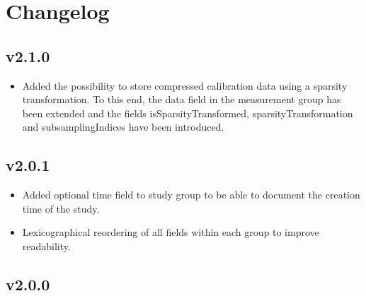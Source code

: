 \documentclass[landscape,a4paper]{article} %
\newcommand{\inlvar}[1]{{\ttfamily#1}}
\begin{document}
\clearpage
\section{Changelog}

\begin{multicols}{2}
\subsection{v2.1.0}

\begin{itemize}
	\item Added the possibility to store compressed calibration data using a sparsity transformation. To this end, the \inlvar{data} field in the  \inlvar{measurement} group has been extended and the fields \inlvar{isSparsityTransformed}, \inlvar{sparsityTransformation} and \inlvar{subsamplingIndices} have been introduced.
\end{itemize}

\subsection{v2.0.1}

\begin{itemize}
	\item Added optional \inlvar{time} field to \inlvar{study} group to be able to document the creation time of the study.
	\item Lexicographical reordering of all fields within each group to improve readability.
\end{itemize}


\subsection{v2.0.0}


\end{multicols}
\end{document}
